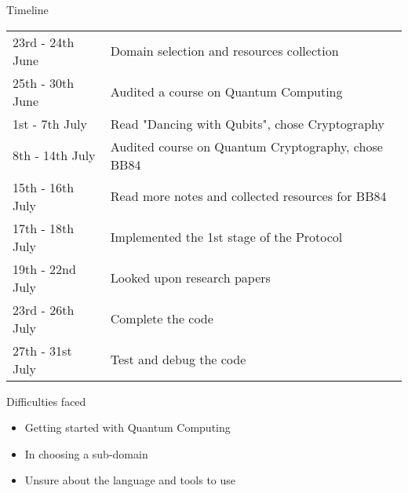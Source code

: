 \documentclass{beamer}
\begin{document}
\begin{frame}{Timeline}
    \begin{tabular}{ll}
            23rd - 24th June & Domain selection and resources collection\\
            25th - 30th June & Audited a course on Quantum Computing\\
            1st - 7th July & Read "Dancing with Qubits", chose Cryptography\\
            8th - 14th July & Audited course on Quantum Cryptography, chose BB84\\
            15th - 16th July & Read more notes and collected resources for BB84\\
            17th - 18th July & Implemented the 1st stage of the Protocol\\
            19th - 22nd July & Looked upon research papers\\
            23rd - 26th July & Complete the code\\
            27th - 31st July & Test and debug the code\\
     \end{tabular}
\end{frame}

\begin{frame}{Difficulties faced}
	\begin{itemize}
		\item Getting started with Quantum Computing
        \item In choosing a sub-domain
        \item Unsure about the language and tools to use
	\end{itemize}
\end{frame}
		
\end{document}
